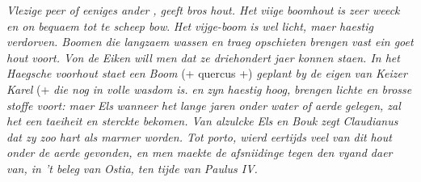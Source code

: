 \pend
\pstart \textit{ Vlezige }\textit{}\textit{ peer of eeniges ander }\textit{, geeft bros }\textit{hout}\protect{}\textit{. Het }\textit{viige boomhout}\protect{}\textit{ is zeer weeck en on bequaem tot te scheep bow}\protect{}. \textit{Het }\textit{vijge-boom}\protect{}\textit{ is wel licht, maer haestig verdorven. Boomen die langzaem wassen en traeg opschieten brengen vast ein goet }\textit{hout}\protect{}\textit{ voort. Von de }\textit{Eiken}\protect{}\textit{ will men dat ze driehondert jaer konnen staen. In het Haegsche voorhout staet een Boom} (+ quercus\protect{} +) \textit{geplant by de eigen }\textit{ van Keizer }\textit{Karel}\protect{} (+  \textit{die nog in volle wasdom is. }
\pend
 \pstart \textit{ }\textit{}\protect{}\textit{ en }\textit{}\protect{}\textit{ zyn haestig hoog, }\textit{ brengen lichte en brosse stoffe voort: maer }\textit{Els}\protect{}\textit{ wanneer het lange jaren onder water of aerde }\textit{ gelegen, zal het een taeiheit en sterckte bekomen. Van alzulcke }\textit{Els}\protect{}\textit{ en Bouk zegt }\textit{Claudianus}\protect{}\textit{ dat zy zoo hart als marmer worden. Tot porto, wierd eertijds veel van dit }\textit{hout}\protect{}\textit{ onder de aerde gevonden, en men maekte de afsniidinge tegen den vyand daer van, in 't beleg van }\textit{Ostia}\protect{}\textit{, ten tijde van }\textit{Paulus IV.}\protect{}\textit{ }
